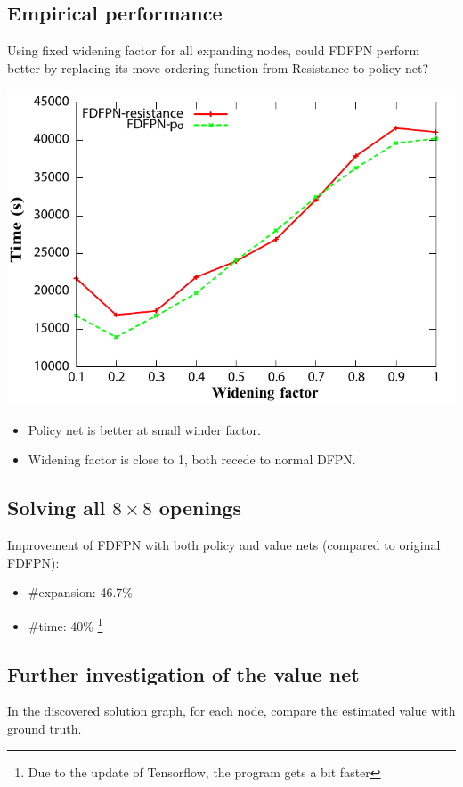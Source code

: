\documentclass[a0,portrait]{a0poster}
\begin{document}
\begin{multicols}{3}
\subsection*{Empirical performance}
Using fixed widening factor for all expanding nodes, could FDFPN perform better by replacing its move
ordering function from Resistance to policy net?
\begin{center}\vspace{1cm}
\includegraphics[width=0.8\linewidth]{mycompare.pdf}
\end{center}\vspace{1cm}
\begin{itemize}
\item Policy net is better at small winder factor.
\item Widening factor is close to 1, both recede to normal DFPN.
\end{itemize}

\subsection*{Solving all $8\times 8$ openings}

Improvement of FDFPN with both policy and value nets (compared to original FDFPN):
\begin{itemize}
\item \#expansion: 46.7\%
\item \#time: 40\% \footnote{Due to the update of Tensorflow, the program gets a bit faster}
\end{itemize}

\subsection*{Further investigation of the value net}
In the discovered solution graph, for each node,
compare the estimated value with ground truth.


\end{multicols}
\end{document}
